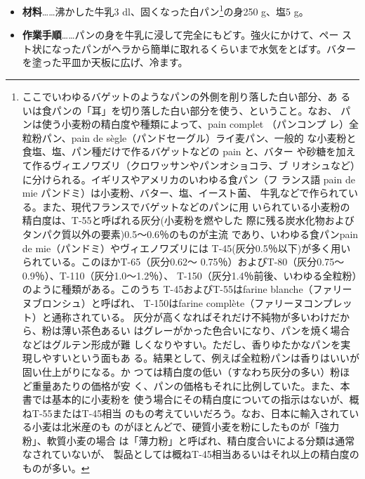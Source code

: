 \begin{recette}
\begin{itemize}
\item
  \textbf{材料}\ldots{}\ldots{}沸かした牛乳3
  dl、固くなった白パン\footnote{ここでいわゆるバゲットのようなパンの外側を削り落した白い部分、あ
    るいは食パンの「耳」を切り落した白い部分を使う、ということ。なお、
    パンは使う小麦粉の精白度や種類によって、pain complet （パンコンプ
    レ）全粒粉パン、pain de sègle（パンドセーグル）ライ麦パン、一般的
    な小麦粉と食塩、塩、パン種だけで作るバゲットなどの pain と、バター
    や砂糖を加えて作るヴィエノワズリ（クロワッサンやパンオショコラ、ブ
    リオシュなど）に分けられる。イギリスやアメリカのいわゆる食パン（フ
    ランス語 pain de mie パンドミ）は小麦粉、バター、塩、イースト菌、
    牛乳などで作られている。また、現代フランスでバゲットなどのパンに用
    いられている小麦粉の精白度は、T-55と呼ばれる灰分(小麦粉を燃やした
    際に残る炭水化物およびタンパク質以外の要素)0.5〜0.6％のものが主流
    であり、いわゆる食パンpain de mie（パンドミ）やヴィエノワズリには
    T-45(灰分0.5％以下)が多く用いられている。このほかT-65（灰分0.62〜
    0.75％）およびT-80（灰分0.75〜0.9％）、T-110（灰分1.0〜1.2％）、
    T-150（灰分1.4％前後、いわゆる全粒粉）のように種類がある。このうち
    T-45およびT-55はfarine blanche（ファリーヌブロンシュ）と呼ばれ、
    T-150はfarine complète（ファリーヌコンプレット）と通称されている。
    灰分が高くなればそれだけ不純物が多いわけだから、粉は薄い茶色あるい
    はグレーがかった色合いになり、パンを焼く場合などはグルテン形成が難
    しくなりやすい。ただし、香りゆたかなパンを実現しやすいという面もあ
    る。結果として、例えば全粒粉パンは香りはいいが固い仕上がりになる。か
    つては精白度の低い（すなわち灰分の多い）粉ほど重量あたりの価格が安
    く、パンの価格もそれに比例していた。また、本書では基本的に小麦粉を
    使う場合にその精白度についての指示はないが、概ねT-55またはT-45相当
    のもの考えていいだろう。なお、日本に輸入されている小麦は北米産のも
    のがほとんどで、硬質小麦を粉にしたものが「強力粉」、軟質小麦の場合
    は「薄力粉」と呼ばれ、精白度合いによる分類は通常なされていないが、
    製品としては概ねT-45相当あるいはそれ以上の精白度のものが多い。}の身250
  g、塩5 g。
\item
  \textbf{作業手順}\ldots{}\ldots{}パンの身を牛乳に浸して完全にもどす。強火にかけて、ペー
  スト状になったパンがヘラから簡単に取れるくらいまで水気をとばす。バター
  を塗った平皿か天板に広げ、冷ます。
\end{itemize}

\maeaki

\hypertarget{b.-ux5c0fux9ea6ux7c89ux306eux30d1ux30caux30fcux30c9}{%
}
\end{recette}
